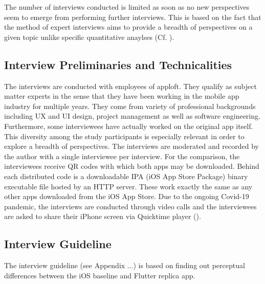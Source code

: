 The number of interviews conducted is limited as soon as no new perspectives seem to emerge from performing further interviews. This is based on the fact that the method of expert interviews 
aims to provide a breadth of perspectives on a given topic unlike specific quantitative anaylses (Cf. \cite{Liebold2009}).


\subsection{Interview Preliminaries and Technicalities}
The interviews are conducted with employees of apploft. They qualify as subject matter experts in the sense that they have been working in the mobile app industry for multiple years. They come from variety
of professional backgrounds including UX and UI design, project management as well as software engineering. Furthermore, some interviewees have actually worked on the original app itself. This diversity 
among the study participants is especially relevant in order to explore a breadth of perspectives. 
The interviews are moderated and recorded by the author with a single interviewee per interview.
For the comparison, the interviewees receive QR codes with which both apps may be downloaded. Behind each distributed code is a downloadable IPA (iOS App Store Package) binary executable file hosted by an HTTP server.
These work exactly the same as any other apps downloaded from the iOS App Store.
Due to the ongoing Covid-19 pandemic, the interviews are conducted through video calls and the interviewees are asked to share their iPhone screen via Quicktime player (\cite{Apple2014}).

\subsection{Interview Guideline} \label{subsection::interview_guideline}
The interview guideline (see Appendix ...) is based on finding out perceptual differences between the iOS baseline and Flutter replica app. 

